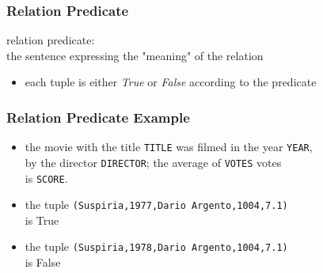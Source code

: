 \documentclass[dvipsnames]{beamer}
\theoremstyle{plain}
\begin{document}
\begin{frame}
  \frametitle{Relation Predicate}

  \begin{definition}
    \alert{relation predicate}:\\
      the sentence expressing the "meaning" of the relation
  \end{definition}

  \begin{itemize}
    \item each tuple is either \emph{True} or \emph{False} according to the
      predicate
  \end{itemize}
\end{frame}

\begin{frame}
  \frametitle{Relation Predicate Example}

  \begin{example}
    \begin{itemize}
      \item the movie with the title \texttt{TITLE} was filmed in the year
	\texttt{YEAR},\\
        by the director \texttt{DIRECTOR}; the average of \texttt{VOTES} votes\\
        is \texttt{SCORE}.

      \pause
      \medskip
      \item the tuple \texttt{(Suspiria,1977,Dario Argento,1004,7.1)}\\
        is True
      \item the tuple \texttt{(Suspiria,1978,Dario Argento,1004,7.1)}\\
        is False
    \end{itemize}
  \end{example}
\end{frame}
\end{document}
